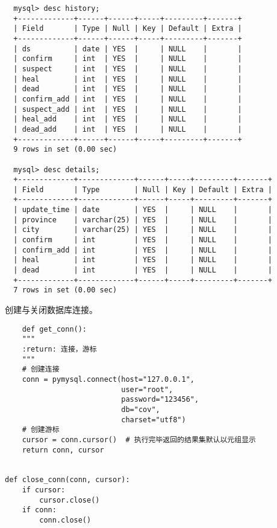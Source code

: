 \begin{lstlisting}
  mysql> desc history;
  +-------------+------+------+-----+---------+-------+
  | Field       | Type | Null | Key | Default | Extra |
  +-------------+------+------+-----+---------+-------+
  | ds          | date | YES  |     | NULL    |       |
  | confirm     | int  | YES  |     | NULL    |       |
  | suspect     | int  | YES  |     | NULL    |       |
  | heal        | int  | YES  |     | NULL    |       |
  | dead        | int  | YES  |     | NULL    |       |
  | confirm_add | int  | YES  |     | NULL    |       |
  | suspect_add | int  | YES  |     | NULL    |       |
  | heal_add    | int  | YES  |     | NULL    |       |
  | dead_add    | int  | YES  |     | NULL    |       |
  +-------------+------+------+-----+---------+-------+
  9 rows in set (0.00 sec)
  
  mysql> desc details;
  +-------------+-------------+------+-----+---------+-------+
  | Field       | Type        | Null | Key | Default | Extra |
  +-------------+-------------+------+-----+---------+-------+
  | update_time | date        | YES  |     | NULL    |       |
  | province    | varchar(25) | YES  |     | NULL    |       |
  | city        | varchar(25) | YES  |     | NULL    |       |
  | confirm     | int         | YES  |     | NULL    |       |
  | confirm_add | int         | YES  |     | NULL    |       |
  | heal        | int         | YES  |     | NULL    |       |
  | dead        | int         | YES  |     | NULL    |       |
  +-------------+-------------+------+-----+---------+-------+
  7 rows in set (0.00 sec)
\end{lstlisting}

创建与关闭数据库连接。

\begin{lstlisting}
    def get_conn():
    """
    :return: 连接，游标
    """
    # 创建连接
    conn = pymysql.connect(host="127.0.0.1",
                           user="root",
                           password="123456",
                           db="cov",
                           charset="utf8")
    # 创建游标
    cursor = conn.cursor()  # 执行完毕返回的结果集默认以元组显示
    return conn, cursor


def close_conn(conn, cursor):
    if cursor:
        cursor.close()
    if conn:
        conn.close()
\end{lstlisting}



